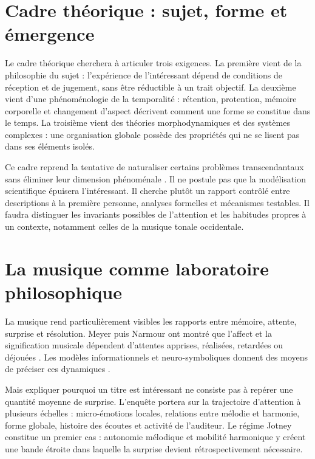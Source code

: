 \documentclass[11pt,a4paper]{article}
\begin{document}
\section{Cadre théorique : sujet, forme et émergence}

Le cadre théorique cherchera à articuler trois exigences. La première vient de la
philosophie du sujet : l'expérience de l'intéressant dépend de conditions de
réception et de jugement, sans être réductible à un trait objectif. La deuxième
vient d'une phénoménologie de la temporalité : rétention, protention, mémoire
corporelle et changement d'aspect décrivent comment une forme se constitue dans
le temps. La troisième vient des théories morphodynamiques et des systèmes
complexes : une organisation globale possède des propriétés qui ne se lisent pas
dans ses éléments isolés.

Ce cadre reprend la tentative de naturaliser certains problèmes
transcendantaux sans éliminer leur dimension phénoménale
\parencite{petitot1993phenomenologie,petitot2002naturaliser}. Il ne postule pas
que la modélisation scientifique épuisera l'intéressant. Il cherche plutôt un
rapport contrôlé entre descriptions à la première personne, analyses formelles
et mécanismes testables. Il faudra distinguer les invariants possibles de
l'attention et les habitudes propres à un contexte, notamment celles de la
musique tonale occidentale.

\section{La musique comme laboratoire philosophique}

La musique rend particulièrement visibles les rapports entre mémoire, attente,
surprise et résolution. Meyer puis Narmour ont montré que l'affect et la
signification musicale dépendent d'attentes apprises, réalisées, retardées ou
déjouées \parencite{meyer1956emotion,narmour1990basic,narmour1992complexity}.
Les modèles informationnels et neuro-symboliques donnent des moyens de préciser
ces dynamiques
\parencite{abdallah2009information,berger1999expectations,gang1999unified}.

Mais expliquer pourquoi un titre est intéressant ne consiste pas à repérer une
quantité moyenne de surprise. L'enquête portera sur la trajectoire d'attention à
plusieurs échelles : micro-émotions locales, relations entre mélodie et harmonie,
forme globale, histoire des écoutes et activité de l'auditeur. Le régime Jotney
constitue un premier cas : autonomie mélodique et mobilité harmonique y créent
une bande étroite dans laquelle la surprise devient rétrospectivement nécessaire.
\end{document}
